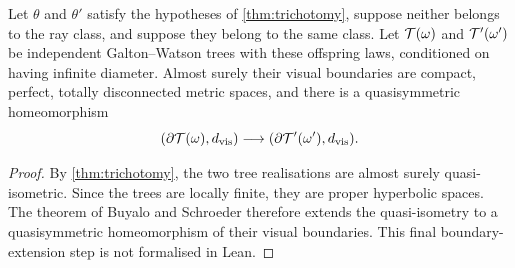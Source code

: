 \begin{corollary}
\label{thm:boundary}
Let $\theta$ and $\theta'$ satisfy the hypotheses of \cref{thm:trichotomy}, suppose neither
belongs to the ray class, and suppose they belong to the same class. Let $\mathcal{T}(\omega)$ and
$\mathcal{T}'(\omega')$ be independent Galton--Watson trees with these offspring laws, conditioned on
having infinite diameter. Almost surely their visual boundaries are compact, perfect, totally
disconnected metric spaces, and there is a quasisymmetric homeomorphism
\[
 (\partial\mathcal{T}(\omega),d_{\mathrm{vis}})
 \longrightarrow(\partial\mathcal{T}'(\omega'),d_{\mathrm{vis}}).
\]
\end{corollary}

\begin{proof}
By \cref{thm:trichotomy}, the two tree realisations are almost surely quasi-isometric. Since the
trees are locally finite, they are proper hyperbolic spaces. The theorem of Buyalo and Schroeder
therefore extends the quasi-isometry to a quasisymmetric homeomorphism of their visual
boundaries. This final boundary-extension step is not formalised in Lean.
\end{proof}
